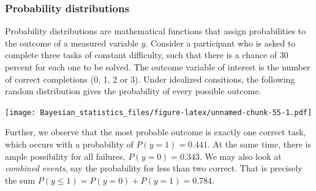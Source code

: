 \documentclass[]{svmono}
\newenvironment{Shaded}{\begin{snugshade}}{\end{snugshade}}
\newcommand{\KeywordTok}[1]{\textcolor[rgb]{0.13,0.29,0.53}{\textbf{#1}}}
\newcommand{\DataTypeTok}[1]{\textcolor[rgb]{0.13,0.29,0.53}{#1}}
\newcommand{\DecValTok}[1]{\textcolor[rgb]{0.00,0.00,0.81}{#1}}
\newcommand{\FloatTok}[1]{\textcolor[rgb]{0.00,0.00,0.81}{#1}}
\newcommand{\StringTok}[1]{\textcolor[rgb]{0.31,0.60,0.02}{#1}}
\newcommand{\OperatorTok}[1]{\textcolor[rgb]{0.81,0.36,0.00}{\textbf{#1}}}
\newcommand{\NormalTok}[1]{#1}
\theoremstyle{definition}
\theoremstyle{definition}
\theoremstyle{definition}
\theoremstyle{remark}
\begin{document}
\subsubsection{Probability
distributions}\label{probability-distributions}

Probability distributions are mathematical functions that assign
probabilities to the outcome of a measured variable \(y\). Consider a
participant who is asked to complete three tasks of constant difficulty,
such that there is a chance of \(30\) percent for each one to be solved.
The outcome variable of interest is the number of correct completions
(0, 1, 2 or 3). Under idealized consitions, the following random
distribution gives the probability of every possible outcome.

\begin{Shaded}
\end{Shaded}

\texttt{[image: Bayesian\_statistics\_files/figure-latex/unnamed-chunk-55-1.pdf]}

Further, we observe that the most probable outcome is exactly one
correct task, which occurs with a probability of \(P(y = 1) = 0.441\).
At the same time, there is ample possibility for all failures,
\(P(y = 0) = 0.343\). We may also look at \emph{combined events}, say
the probability for less than two correct. That is precisely the sum
\(P(y \leq 1) = P(y = 0) + P(y = 1) = 0.784\).
\end{document}
